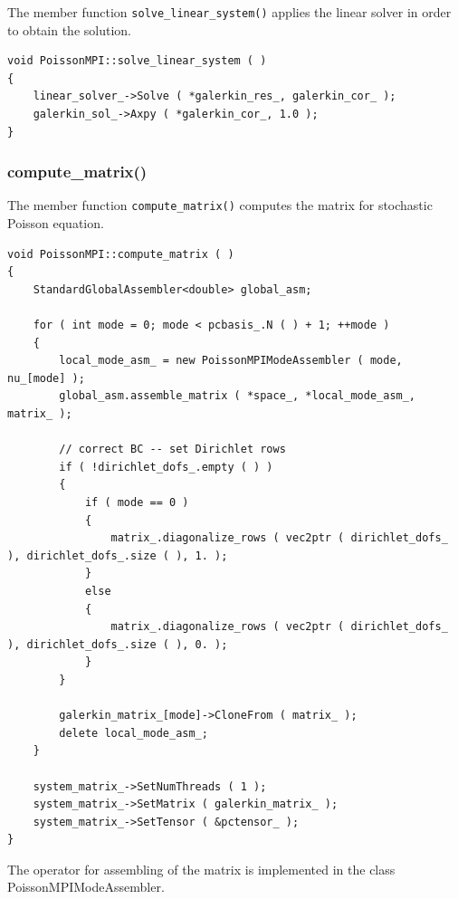 \documentclass{article}
\begin{document}
The member function \texttt{solve\_linear\_system()} applies the linear solver in order to obtain the solution.

\begin{lstlisting}
void PoissonMPI::solve_linear_system ( )
{
    linear_solver_->Solve ( *galerkin_res_, galerkin_cor_ );
    galerkin_sol_->Axpy ( *galerkin_cor_, 1.0 );
}
\end{lstlisting}


\subsubsection{compute\_matrix()}

The member function \texttt{compute\_matrix()} computes the matrix for stochastic Poisson equation.

\begin{lstlisting}
void PoissonMPI::compute_matrix ( )
{
    StandardGlobalAssembler<double> global_asm;

    for ( int mode = 0; mode < pcbasis_.N ( ) + 1; ++mode )
    {
        local_mode_asm_ = new PoissonMPIModeAssembler ( mode, nu_[mode] );
        global_asm.assemble_matrix ( *space_, *local_mode_asm_, matrix_ );

        // correct BC -- set Dirichlet rows
        if ( !dirichlet_dofs_.empty ( ) )
        {
            if ( mode == 0 )
            {
                matrix_.diagonalize_rows ( vec2ptr ( dirichlet_dofs_ ), dirichlet_dofs_.size ( ), 1. );
            }
            else
            {
                matrix_.diagonalize_rows ( vec2ptr ( dirichlet_dofs_ ), dirichlet_dofs_.size ( ), 0. );
            }
        }

        galerkin_matrix_[mode]->CloneFrom ( matrix_ );
        delete local_mode_asm_;
    }

    system_matrix_->SetNumThreads ( 1 );
    system_matrix_->SetMatrix ( galerkin_matrix_ );
    system_matrix_->SetTensor ( &pctensor_ );
}
\end{lstlisting}

The operator for assembling of the matrix is implemented in the class PoissonMPIModeAssembler.
\end{document}
